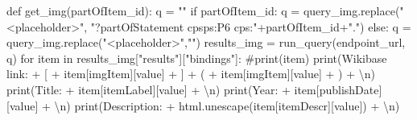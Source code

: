 \documentclass[
  a4paper,
]{book}
\newenvironment{Shaded}{\begin{snugshade}}{\end{snugshade}}
\newcommand{\BuiltInTok}[1]{\textcolor[rgb]{0.00,0.23,0.31}{#1}}
\newcommand{\CharTok}[1]{\textcolor[rgb]{0.13,0.47,0.30}{#1}}
\newcommand{\CommentTok}[1]{\textcolor[rgb]{0.37,0.37,0.37}{#1}}
\newcommand{\ControlFlowTok}[1]{\textcolor[rgb]{0.00,0.23,0.31}{#1}}
\newcommand{\KeywordTok}[1]{\textcolor[rgb]{0.00,0.23,0.31}{#1}}
\newcommand{\NormalTok}[1]{\textcolor[rgb]{0.00,0.23,0.31}{#1}}
\newcommand{\OperatorTok}[1]{\textcolor[rgb]{0.37,0.37,0.37}{#1}}
\newcommand{\StringTok}[1]{\textcolor[rgb]{0.13,0.47,0.30}{#1}}
\begin{document}
\begin{Shaded}
\begin{Highlighting}[]
\KeywordTok{def}\NormalTok{ get\_img(partOfItem\_id):}
\NormalTok{    q }\OperatorTok{=} \StringTok{""}
    \ControlFlowTok{if}\NormalTok{ partOfItem\_id:}
\NormalTok{        q }\OperatorTok{=}\NormalTok{ query\_img.replace(}\StringTok{"\textless{}placeholder\textgreater{}"}\NormalTok{, }\StringTok{"?partOfStatement cpsps:P6 cps:"}\OperatorTok{+}\NormalTok{partOfItem\_id}\OperatorTok{+}\StringTok{"."}\NormalTok{)}
    \ControlFlowTok{else}\NormalTok{:}
\NormalTok{        q }\OperatorTok{=}\NormalTok{ query\_img.replace(}\StringTok{"\textless{}placeholder\textgreater{}"}\NormalTok{,}\StringTok{""}\NormalTok{)}
\NormalTok{    results\_img }\OperatorTok{=}\NormalTok{ run\_query(endpoint\_url, q)}
    \ControlFlowTok{for}\NormalTok{ item }\KeywordTok{in}\NormalTok{ results\_img[}\StringTok{"results"}\NormalTok{][}\StringTok{"bindings"}\NormalTok{]:    }
      \CommentTok{\#print(item)}
      \BuiltInTok{print}\NormalTok{(}\StringTok{\textquotesingle{}Wikibase link: \textquotesingle{}} \OperatorTok{+} \StringTok{\textquotesingle{}[\textquotesingle{}} \OperatorTok{+}\NormalTok{ item[}\StringTok{\textquotesingle{}imgItem\textquotesingle{}}\NormalTok{][}\StringTok{\textquotesingle{}value\textquotesingle{}}\NormalTok{] }\OperatorTok{+} \StringTok{\textquotesingle{}]\textquotesingle{}} \OperatorTok{+} \StringTok{\textquotesingle{}(\textquotesingle{}} \OperatorTok{+}\NormalTok{ item[}\StringTok{\textquotesingle{}imgItem\textquotesingle{}}\NormalTok{][}\StringTok{\textquotesingle{}value\textquotesingle{}}\NormalTok{] }\OperatorTok{+} \StringTok{\textquotesingle{})\textquotesingle{}} \OperatorTok{+} \StringTok{\textquotesingle{}}\CharTok{\textbackslash{}n}\StringTok{\textquotesingle{}}\NormalTok{)}
      \BuiltInTok{print}\NormalTok{(}\StringTok{\textquotesingle{}Title: \textquotesingle{}} \OperatorTok{+}\NormalTok{ item[}\StringTok{\textquotesingle{}itemLabel\textquotesingle{}}\NormalTok{][}\StringTok{\textquotesingle{}value\textquotesingle{}}\NormalTok{] }\OperatorTok{+} \StringTok{\textquotesingle{}}\CharTok{\textbackslash{}n}\StringTok{\textquotesingle{}}\NormalTok{)}
      \BuiltInTok{print}\NormalTok{(}\StringTok{\textquotesingle{}Year: \textquotesingle{}} \OperatorTok{+}\NormalTok{ item[}\StringTok{\textquotesingle{}publishDate\textquotesingle{}}\NormalTok{][}\StringTok{\textquotesingle{}value\textquotesingle{}}\NormalTok{] }\OperatorTok{+} \StringTok{\textquotesingle{}}\CharTok{\textbackslash{}n}\StringTok{\textquotesingle{}}\NormalTok{)}
      \BuiltInTok{print}\NormalTok{(}\StringTok{\textquotesingle{}Description: \textquotesingle{}} \OperatorTok{+}\NormalTok{ html.unescape(item[}\StringTok{\textquotesingle{}itemDescr\textquotesingle{}}\NormalTok{][}\StringTok{\textquotesingle{}value\textquotesingle{}}\NormalTok{]) }\OperatorTok{+} \StringTok{\textquotesingle{}}\CharTok{\textbackslash{}n}\StringTok{\textquotesingle{}}\NormalTok{)}


\end{Highlighting}
\end{Shaded}
\end{document}
